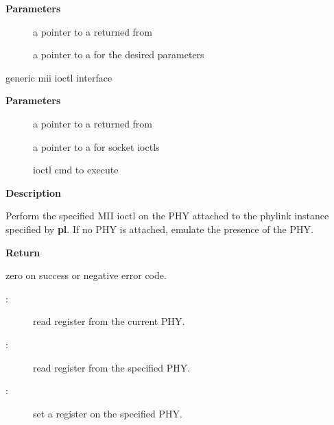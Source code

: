 \documentclass[a4paper,8pt,english]{sphinxmanual}
\begin{document}
\textbf{Parameters}
\begin{description}
\item[{}] \leavevmode
a pointer to a {\hyperref[networking/kapi:c.phylink]{\emph{}}} returned from {\hyperref[networking/kapi:c.phylink_create]{\emph{}}}

\item[{}] \leavevmode
a pointer to a  for the desired parameters

\end{description}

\begin{fulllineitems}
\label{networking/kapi:c.phylink_mii_ioctl}
generic mii ioctl interface

\end{fulllineitems}


\textbf{Parameters}
\begin{description}
\item[{}] \leavevmode
a pointer to a {\hyperref[networking/kapi:c.phylink]{\emph{}}} returned from {\hyperref[networking/kapi:c.phylink_create]{\emph{}}}

\item[{}] \leavevmode
a pointer to a  for socket ioctls

\item[{}] \leavevmode
ioctl cmd to execute

\end{description}

\textbf{Description}

Perform the specified MII ioctl on the PHY attached to the phylink instance
specified by \textbf{pl}. If no PHY is attached, emulate the presence of the PHY.

\textbf{Return}

zero on success or negative error code.
\begin{description}
\item[{:}] \leavevmode
read register from the current PHY.

\item[{:}] \leavevmode
read register from the specified PHY.

\item[{:}] \leavevmode
set a register on the specified PHY.

\end{description}
\end{document}
